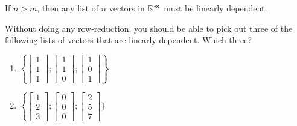 If $n>m$, then any list of $n$ vectors in $\mathbb R^m$ must be linearly dependent.  


\endedxtext






Without doing any row-reduction, you should be able to pick out three of the 
following lists of vectors that are linearly dependent.  Which three?  

\begin{enumerate}


\item
$\left\{ \left[ \begin{array}{c} 1 \\ 1 \\ 1 \end{array} \right]; 
\left[ \begin{array}{c} 1 \\ 1 \\ 0 \end{array} \right]; 
\left[ \begin{array}{c} 1 \\ 0 \\ 1 \end{array} \right] \right\}
$


\item
$\left\{\left[ \begin{array}{c} 1 \\ 2 \\ 3 \end{array} \right] ; 
\left[ \begin{array}{c} 0 \\ 0 \\ 0 \end{array} \right] ; 
\left[ \begin{array}{c} 2 \\ 5 \\ 7 \end{array} \right]\} $




\end{enumerate}
